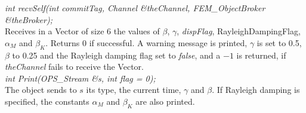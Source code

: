 {\em int recvSelf(int commitTag, Channel \&theChannel, 
FEM\_ObjectBroker \&theBroker); } \\ 
Receives in a Vector of size 6 the values of $\beta$, $\gamma$, {\em
dispFlag}, RayleighDampingFlag, $\alpha_M$ and $\beta_K$. Returns $0$
if successful. A warning message is printed, $\gamma$ is set to 0.5,
$\beta$ to 0.25 and the Rayleigh damping flag set to {\em false}, and
a $-1$ is returned, if {\em theChannel} fails to receive the Vector.\\ 

{\em int Print(OPS_Stream \&s, int flag = 0);}\\
The object sends to $s$ its type, the current time, $\gamma$ and
$\beta$. If Rayleigh damping is specified, the constants $\alpha_M$ and
$\beta_K$ are also printed.






